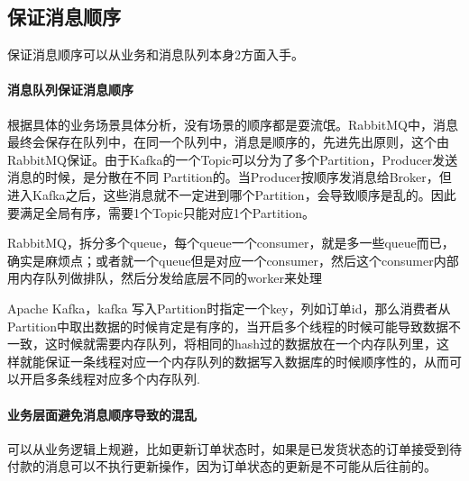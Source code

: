 \documentclass[../../../interview-questions.tex]{subfiles}
\begin{document}
\subsection{保证消息顺序}

保证消息顺序可以从业务和消息队列本身2方面入手。

\paragraph{消息队列保证消息顺序}

根据具体的业务场景具体分析，没有场景的顺序都是耍流氓。RabbitMQ中，消息最终会保存在队列中，在同一个队列中，消息是顺序的，先进先出原则，这个由RabbitMQ保证。由于Kafka的一个Topic可以分为了多个Partition，Producer发送消息的时候，是分散在不同 Partition的。当Producer按顺序发消息给Broker，但进入Kafka之后，这些消息就不一定进到哪个Partition，会导致顺序是乱的。因此要满足全局有序，需要1个Topic只能对应1个Partition。

RabbitMQ，拆分多个queue，每个queue一个consumer，就是多一些queue而已，确实是麻烦点；或者就一个queue但是对应一个consumer，然后这个consumer内部用内存队列做排队，然后分发给底层不同的worker来处理

Apache Kafka，kafka 写入Partition时指定一个key，列如订单id，那么消费者从Partition中取出数据的时候肯定是有序的，当开启多个线程的时候可能导致数据不一致，这时候就需要内存队列，将相同的hash过的数据放在一个内存队列里，这样就能保证一条线程对应一个内存队列的数据写入数据库的时候顺序性的，从而可以开启多条线程对应多个内存队列.

\paragraph{业务层面避免消息顺序导致的混乱}

可以从业务逻辑上规避，比如更新订单状态时，如果是已发货状态的订单接受到待付款的消息可以不执行更新操作，因为订单状态的更新是不可能从后往前的。
\end{document}
